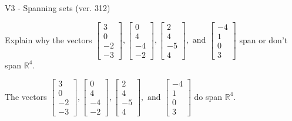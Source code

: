 \begin{exercise}
  \begin{exerciseTitle}V3 - Spanning sets (ver. 312)\end{exerciseTitle}
  \begin{exerciseStatement}
    Explain why the vectors \(\left[\begin{array}{r}
3 \\
0 \\
-2 \\
-3
\end{array}\right] , \left[\begin{array}{r}
0 \\
4 \\
-4 \\
-2
\end{array}\right] , \left[\begin{array}{r}
2 \\
4 \\
-5 \\
4
\end{array}\right] , \text{ and } \left[\begin{array}{r}
-4 \\
1 \\
0 \\
3
\end{array}\right]\) span or don't span \(\mathbb{R}^4\). 
	


  \end{exerciseStatement}
  \begin{exerciseAnswer}
   The vectors \(\left[\begin{array}{r}
3 \\
0 \\
-2 \\
-3
\end{array}\right] , \left[\begin{array}{r}
0 \\
4 \\
-4 \\
-2
\end{array}\right] , \left[\begin{array}{r}
2 \\
4 \\
-5 \\
4
\end{array}\right] , \text{ and } \left[\begin{array}{r}
-4 \\
1 \\
0 \\
3
\end{array}\right]\) 
  	 do  
	span \(\mathbb{R}^4\).
  


  \end{exerciseAnswer}
\end{exercise}